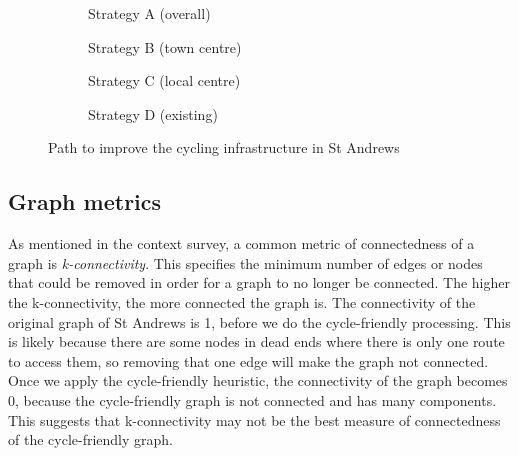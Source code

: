 \documentclass[12pt,a4paper]{report}
\begin{document}
\begin{figure}[ht]
    \centering
    \begin{subfigure}[ht]{0.47\textwidth}
        \centering
        
        \caption{Strategy A (overall)}
        \label{fig:overall st andrews}
    \end{subfigure}
    \hfill
    \begin{subfigure}[ht]{0.47\textwidth}
        \centering
        
        \caption{Strategy B (town centre)}
        \label{fig:centre st andrews}
    \end{subfigure}
    \hfill
    \begin{subfigure}[ht]{0.47\textwidth}
        \centering
        
        \caption{Strategy C (local centre)}
        \label{fig:local st andrews}
    \end{subfigure}
    \hfill
    \begin{subfigure}[ht]{0.47\textwidth}
        \centering
        
        \caption{Strategy D (existing)}
        \label{fig:existing st andrews}
    \end{subfigure}
       \caption{Path to improve the cycling infrastructure in St Andrews}
       \label{fig:path st andrews}
\end{figure}

\subsection{Graph metrics}\label{sec:metrics}
As mentioned in the context survey, a common metric of connectedness of a graph is \textit{k-connectivity}. This specifies the minimum number of edges or nodes that could be removed in order for a graph to no longer be connected. The higher the k-connectivity, the more connected the graph is. The connectivity of the original graph of St Andrews is 1, before we do the cycle-friendly processing. This is likely because there are some nodes in dead ends where there is only one route to access them, so removing that one edge will make the graph not connected. Once we apply the cycle-friendly heuristic, the connectivity of the graph becomes 0, because the cycle-friendly graph is not connected and has many components. This suggests that k-connectivity may not be the best measure of connectedness of the cycle-friendly graph.
\end{document}
